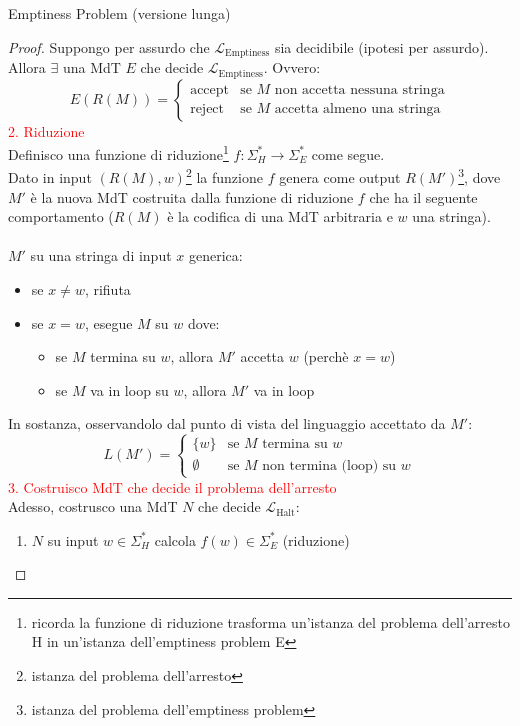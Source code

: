 \documentclass{article}  %
\theoremstyle{definition}
\begin{document}
\begin{theorem}{Emptiness Problem (versione lunga)}
\begin{proof}
		Suppongo per assurdo che $\mathcal{L}_{\text{Emptiness}}$ sia decidibile (ipotesi per assurdo). Allora $\exists$ una MdT $E$ che decide $\mathcal{L}_{\text{Emptiness}}$.
		Ovvero:
		\[
			E(R(M)) =
			\begin{cases}
				\text{accept} & \text{se } M \text{ non accetta nessuna stringa} \\
				\text{reject} & \text{se } M \text{  accetta almeno una stringa}
			\end{cases}
		\]
		\textcolor{red}{2. Riduzione} \\
		Definisco una funzione di riduzione\footnote{ricorda la funzione di riduzione trasforma un'istanza del problema dell'arresto H in un'istanza dell'emptiness problem E}
		$f: \Sigma_H^* \rightarrow \Sigma_E^*$ come segue. \\
		Dato in input $(R(M),w)$\footnote{istanza del problema dell'arresto}  la funzione $f$ genera come output $R(M')$\footnote{istanza del problema dell'emptiness problem},
		dove $M'$ è la nuova MdT costruita dalla funzione di riduzione $f$ che ha il seguente comportamento ($R(M)$ è la codifica di una MdT arbitraria
		e $w$ una stringa). \\ \\ $M'$ su una stringa di input $x$ generica:
		\begin{itemize}
			\item se $x \neq w$, rifiuta
			\item se $x = w$, esegue $M$ su $w$ dove:
			      \begin{itemize}
				      \item se $M$ termina su $w$, allora $M'$ accetta $w$ (perchè $x=w$)
				      \item se $M$ va in loop su $w$, allora $M'$ va in loop
			      \end{itemize}
		\end{itemize}
		In sostanza, osservandolo dal punto di vista del linguaggio accettato da $M'$:
		\[
			L(M') =
			\begin{cases}
				\{w\}     & \text{se } M \text{ termina su } w            \\
				\emptyset & \text{se } M \text{ non termina (loop) su } w
			\end{cases}
		\]
		\textcolor{red}{3. Costruisco MdT che decide il problema dell'arresto} \\
		Adesso, costrusco una MdT $N$ che decide $\mathcal{L}_{\text{Halt}}$:
		\begin{enumerate}
			\item $N$ su input $w \in \Sigma_H^*$ calcola $f(w) \in \Sigma_E^*$ (riduzione)

\end{enumerate}
\end{proof}
\end{theorem}
\end{document}
